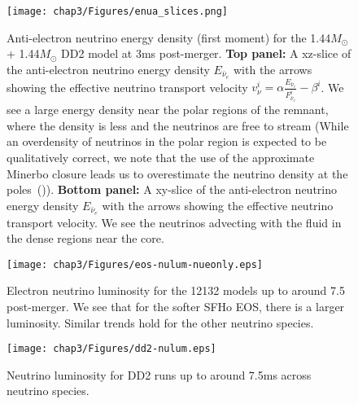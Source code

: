 \begin{figure}[!htbp]
  \centering
\texttt{[image: chap3/Figures/enua\_slices.png]}
\caption{
  Anti-electron neutrino energy density (first moment) for the 1.44$M_\odot$ + 1.44$M_\odot$ DD2 model at 3ms post-merger. \textbf{Top panel:} A xz-slice of the anti-electron neutrino energy density $E_{\bar\nu_e}$ with the arrows showing the effective neutrino transport velocity $v_\nu^i = \alpha \frac{E_{\bar\nu_e}}{F^i_{\bar\nu_e}} - \beta^i$. We see a large energy density near the polar regions of the remnant, where the density is less and the neutrinos are free to stream (While an overdensity of neutrinos in the polar region is expected to be qualitatively correct, we note that the use of the approximate Minerbo closure leads us to overestimate the neutrino density at the poles~(\citet*{foucart2016impact})). \textbf{Bottom panel:} A xy-slice of the anti-electron neutrino energy density $E_{\bar\nu_e}$ with the arrows showing the effective neutrino transport velocity. We see the neutrinos advecting with the fluid in the dense regions near the core.
}
  \label{fig:d144144_3ms_ENua}
\end{figure}
%

\begin{figure}[H]
  \centering
  \texttt{[image: chap3/Figures/eos-nulum-nueonly.eps]}
\caption{
  Electron neutrino luminosity for the 12132 models up to around 7.5 post-merger. We see that for the softer SFHo EOS, there is a larger luminosity. Similar trends hold for the other neutrino species.
}
\label{fig:nulum_table_eos}
\end{figure}


\begin{figure}[H]
  \centering
  \texttt{[image: chap3/Figures/dd2-nulum.eps]}
\caption{
  Neutrino luminosity for DD2 runs up to around 7.5ms across neutrino species.
}
\label{fig:nulum_table_dd2}
\end{figure}

